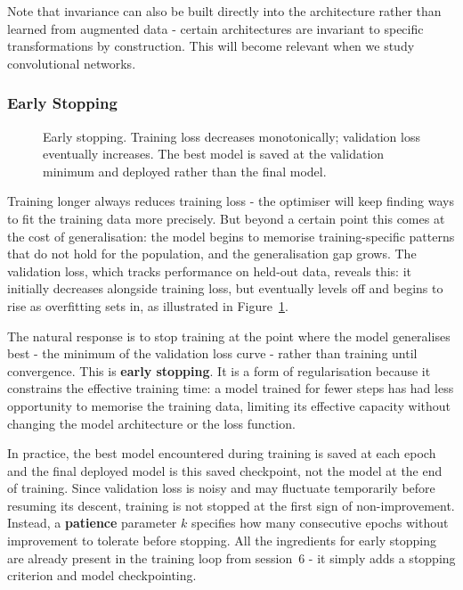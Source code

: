 Note that invariance can also be built directly into the architecture rather than learned from augmented data - certain architectures are invariant to specific transformations by construction. This will become relevant when we study convolutional networks.

\subsubsection{Early Stopping}

\begin{figure}
\centering
{}
\resizebox{0.36\textwidth}{!}{}
\caption{Early stopping. Training loss decreases monotonically; validation loss eventually increases. The best model is saved at the validation minimum and deployed rather than the final model.}
\label{fig:early_stopping}
\end{figure}

Training longer always reduces training loss - the optimiser will keep finding ways to fit the training data more precisely. But beyond a certain point this comes at the cost of generalisation: the model begins to memorise training-specific patterns that do not hold for the population, and the generalisation gap grows. The validation loss, which tracks performance on held-out data, reveals this: it initially decreases alongside training loss, but eventually levels off and begins to rise as overfitting sets in, as illustrated in Figure~\ref{fig:early_stopping}.

The natural response is to stop training at the point where the model generalises best - the minimum of the validation loss curve - rather than training until convergence. This is \textbf{early stopping}. It is a form of regularisation because it constrains the effective training time: a model trained for fewer steps has had less opportunity to memorise the training data, limiting its effective capacity without changing the model architecture or the loss function.

In practice, the best model encountered during training is saved at each epoch and the final deployed model is this saved checkpoint, not the model at the end of training. Since validation loss is noisy and may fluctuate temporarily before resuming its descent, training is not stopped at the first sign of non-improvement. Instead, a \textbf{patience} parameter $k$ specifies how many consecutive epochs without improvement to tolerate before stopping. All the ingredients for early stopping are already present in the training loop from session~6 - it simply adds a stopping criterion and model checkpointing.

